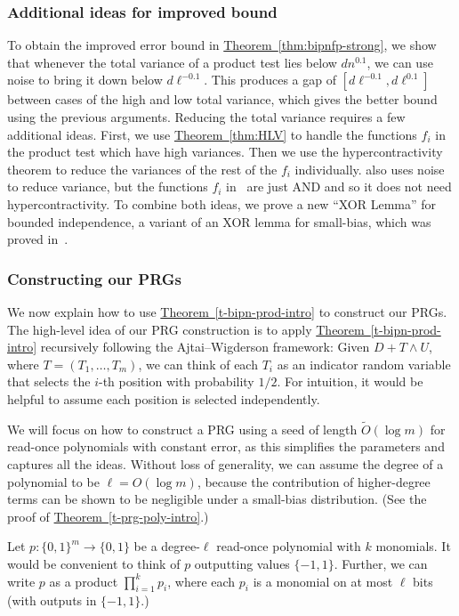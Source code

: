 \documentclass[11pt]{article}
\numberwithin{equation}{section}
\theoremstyle{definition}
\theoremstyle{plain}
\newcommand{\expref}[2]{\hyperref[#2]{#1~\ref{#2}}}
\newcommand{\zo}{\{0,1\}}
\def\pmone{\{-1, 1\}}
\def\Blocklength{\ell}
\begin{document}
\subsubsection{Additional ideas for improved bound}   %
To obtain the improved error bound in \expref{Theorem}{thm:bipnfp-strong}, we show that whenever the total variance of a product test lies below $dn^{0.1}$, we can use noise to bring it down below $d\Blocklength^{-0.1}$.
This produces a gap of $[d\Blocklength^{-0.1}, d\Blocklength^{0.1}]$ between cases of the high and low total variance, which gives the better bound using the previous arguments.
Reducing the total variance requires a few additional ideas.
First, we use \expref{Theorem}{thm:HLV} to handle the functions $f_i$ in the product test which have high variances.
Then we use the hypercontractivity theorem to reduce the variances of the rest of the $f_i$ individually.
\cite{GopalanMRTV12} also uses noise to reduce variance, but the functions $f_i$ in~\cite{GopalanMRTV12} are just AND and so it does not need hypercontractivity.
To combine both ideas, we prove a new ``XOR Lemma'' for bounded independence, a variant of an XOR lemma for small-bias, which was proved in~\cite{GopalanMRTV12}.

\subsubsection{Constructing our PRGs}  %
We now explain how to use \expref{Theorem}{t-bipn-prod-intro} to construct our PRGs.
The high-level idea of our PRG construction is to apply \expref{Theorem}{t-bipn-prod-intro} recursively following the Ajtai--Wigderson framework:
Given $D + T \wedge U$, where $T = (T_1, \ldots, T_m)$, we can think of each $T_i$ as an indicator random variable that selects the $i$-th position with probability $1/2$.
For intuition, it would be helpful to assume each position is selected independently.

We will focus on how to construct a PRG using a seed of length $\tilde O(\log m)$ for read-once polynomials with constant error, as this simplifies the parameters and captures all the ideas.
Without loss of generality, we can assume the degree of a polynomial to be $\Blocklength = O(\log m)$, because the contribution of higher-degree terms can be shown to be negligible under a small-bias distribution. (See the proof of \expref{Theorem}{t-prg-poly-intro}.)

Let $p\colon \zo^m \to \zo$ be a degree-$\Blocklength$ read-once polynomial with $k$ monomials.
It would be convenient to think of $p$ outputting values $\pmone$.
Further, we can write $p$ as a product $\prod_{i=1}^k p_i$, where each $p_i$ is a monomial on at most $\Blocklength$ bits (with outputs in $\pmone$.)
\end{document}

